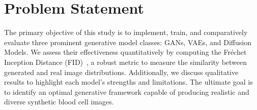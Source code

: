 \section{Problem Statement}

The primary objective of this study is to implement, train, and comparatively evaluate three prominent generative model classes: GANs, VAEs, and Diffusion Models. We assess their effectiveness quantitatively by computing the Fréchet Inception Distance (FID)~\cite{heusel2017gans}, a robust metric to measure the similarity between generated and real image distributions. Additionally, we discuss qualitative results to highlight each model's strengths and limitations. The ultimate goal is to identify an optimal generative framework capable of producing realistic and diverse synthetic blood cell images.